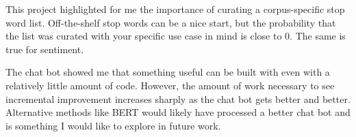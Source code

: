 \documentclass{article}
\begin{document}
This project highlighted for me the importance of curating a corpus-specific stop word list. Off-the-shelf stop words can be a nice start, but the probability that the list was curated with your specific use case in mind is close to 0. The same is true for sentiment. 

The chat bot showed me that something useful can be built with even with a relatively little amount of code. However, the amount of work necessary to see incremental improvement increases sharply as the chat bot gets better and better. Alternative methods like BERT would likely have processed a better chat bot and is something I would like to explore in future work. 



\end{document}
